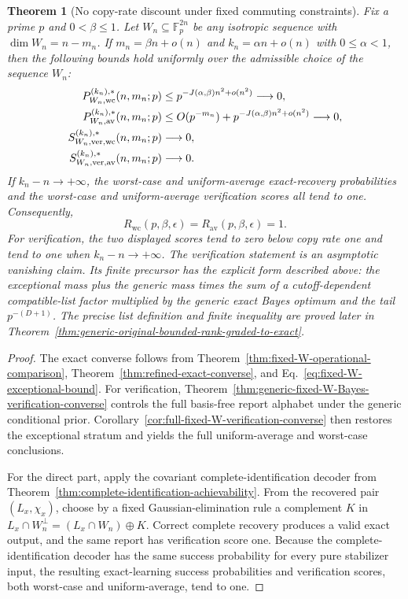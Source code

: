 \documentclass[11pt]{article}
\newcommand{\F}{\mathbb F}
\newcommand{\1}{\mathbf 1}
\theoremstyle{plain}
\newtheorem{theorem}{Theorem}[section]
\theoremstyle{definition}
\theoremstyle{remark}
\begin{document}
\begin{theorem}[No copy-rate discount under fixed commuting constraints]
\label{thm:fixed-W-no-discount}
Fix a prime $p$ and $0<\beta\le1$.  Let $W_n\subseteq\F_p^{2n}$ be any
isotropic sequence with $\dim W_n=n-m_n$.  If $m_n=\beta n+o(n)$ and
$k_n=\alpha n+o(n)$ with $0\le\alpha<1$, then the following bounds hold
uniformly over the admissible choice of the sequence $W_n$:
\begin{align}
 P_{W_n,\rm wc}^{(k_n),*}(n,m_n;p)
 &\le p^{-J(\alpha,\beta)n^2+o(n^2)}\longrightarrow0,
 \label{eq:fixed-W-wc-converse}\\
 P_{W_n,\rm av}^{(k_n),*}(n,m_n;p)
 &\le O(p^{-m_n})+p^{-J(\alpha,\beta)n^2+o(n^2)}\longrightarrow0,
 \label{eq:fixed-W-av-converse}\\
 S_{W_n,\rm ver,wc}^{(k_n),*}(n,m_n;p)&\longrightarrow0,
 \label{eq:fixed-W-ver-wc-converse}\\
 S_{W_n,\rm ver,av}^{(k_n),*}(n,m_n;p)&\longrightarrow0.
 \label{eq:fixed-W-ver-av-converse}
\end{align}
If $k_n-n\to+\infty$, the worst-case and uniform-average exact-recovery
probabilities and the worst-case and uniform-average verification scores all
tend to one.
Consequently,
\begin{equation}
 R_{\mathrm{wc}}(p,\beta,\epsilon)=R_{\mathrm{av}}(p,\beta,\epsilon)=1.
 \label{eq:fixed-W-two-rates-one}
\end{equation}
For verification, the two displayed scores tend to zero below copy rate one
and tend to one when $k_n-n\to+\infty$.  The verification statement is an
asymptotic vanishing claim.  Its finite precursor has the explicit form described
above: the exceptional mass plus the generic mass times the sum of a
cutoff-dependent compatible-list factor multiplied by the generic exact Bayes
optimum and the tail $p^{-(D+1)}$.  The precise list definition and finite
inequality are proved later in
Theorem~\ref{thm:generic-original-bounded-rank-graded-to-exact}.
\end{theorem}
\begin{proof}
The exact converse follows from
Theorem~\ref{thm:fixed-W-operational-comparison},
Theorem~\ref{thm:refined-exact-converse}, and
Eq.~\eqref{eq:fixed-W-exceptional-bound}.  For verification,
Theorem~\ref{thm:generic-fixed-W-Bayes-verification-converse} controls the
full basis-free report alphabet under the generic conditional prior.
Corollary~\ref{cor:full-fixed-W-verification-converse} then restores the
exceptional stratum and yields the full uniform-average and worst-case
conclusions.

For the direct part, apply the covariant complete-identification decoder from
Theorem~\ref{thm:complete-identification-achievability}.  From the recovered
pair $(L_x,\chi_x)$, choose by a fixed Gaussian-elimination rule a complement
$K$ in $L_x\cap W_n^\perp=(L_x\cap W_n)\oplus K$.  Correct complete recovery
produces a valid exact output, and the same report has verification score one.
Because the complete-identification decoder has the same success probability
for every pure stabilizer input, the resulting exact-learning success
probabilities and verification scores, both worst-case and uniform-average,
tend to one.
\end{proof}
\end{document}
